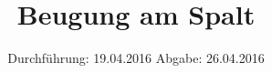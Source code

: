 

\subject{406}
\title{Beugung am Spalt}
\date{
  Durchführung: 19.04.2016
  \hspace{3em}
  Abgabe: 26.04.2016
}



\maketitle
\thispagestyle{empty}
\tableofcontents
\newpage






\printbibliography


